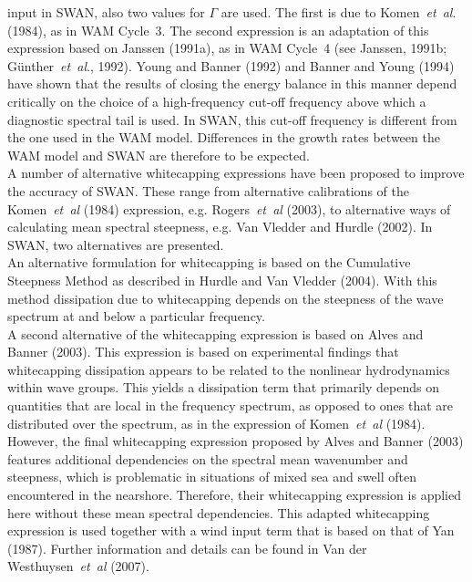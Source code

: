 \documentclass[12pt]{book}
\begin{document}
input in SWAN, also two values for $\Gamma$ are used. The first is due to Komen~{\it et~al}. (1984), as in WAM Cycle~3.
The second expression is an adaptation of this expression based on Janssen (1991a), as in WAM Cycle~4
(see Janssen, 1991b; G\"{u}nther~{\it et~al}., 1992). Young and Banner (1992) and Banner and Young (1994) have shown that
the results of closing the energy balance in this manner depend critically on the choice of a high-frequency cut-off
frequency above which a diagnostic spectral tail is used. In SWAN, this cut-off frequency is different from
the one used in the WAM model. Differences in the growth rates between the WAM model and SWAN are therefore to be
expected.
\nocite{Has74,Jan91b,Gun92HJ,You92B,Ban94Y}
\\[2ex]
\noindent
A number of alternative whitecapping expressions have been proposed to improve the accuracy of SWAN. These range
from alternative calibrations of the Komen~{\it et~al} (1984) expression, e.g. Rogers~{\it et~al} (2003), to
alternative ways of calculating mean spectral steepness, e.g. Van Vledder and Hurdle (2002). In SWAN, two
alternatives are presented.
\nocite{Vle02H}
\\[2ex]
\noindent
An alternative formulation for whitecapping is based on the Cumulative Steepness Method as described
in Hurdle and Van Vledder (2004). With this method dissipation due to whitecapping depends on the steepness of
the wave spectrum at and below a particular frequency.
\\[2ex]
\noindent
A second alternative of the whitecapping expression is based on Alves and Banner (2003). This expression is based
on experimental findings that whitecapping dissipation appears to be related to the nonlinear hydrodynamics within
wave groups. This yields a dissipation term that primarily depends on quantities that are local in the frequency
spectrum, as opposed to ones that are distributed over the spectrum, as in the expression of Komen~{\it et~al} (1984).
However, the final whitecapping expression proposed by Alves and Banner (2003) features additional dependencies on
the spectral mean wavenumber and steepness, which is problematic in situations of mixed sea and swell often
encountered in the nearshore. Therefore, their whitecapping expression is applied here without these mean spectral
dependencies. This adapted whitecapping expression is used together with a wind input term that is based on that
of Yan (1987). Further information and details can be found in Van der Westhuysen~{\it et~al} (2007).
\nocite{Alv03B,Yan87,Wes07ZB}
\\[2ex]
\end{document}
